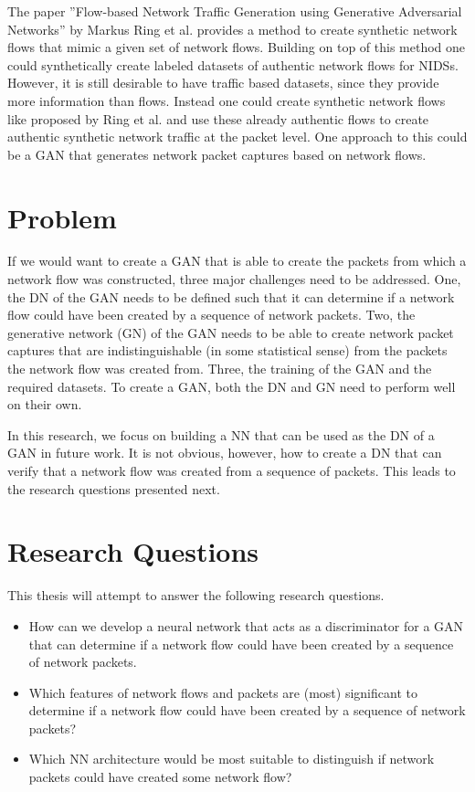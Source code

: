 \documentclass[
	ngerman,
	ruledheaders=section,%
	class=report,%
	thesis={type=bachelor},%
	accentcolor=9c,%
	custommargins=true,%
	marginpar=false,%
	parskip=half-,%
	fontsize=11pt,%
]{tudapub}
\begin{document}
The paper ''Flow-based Network Traffic Generation using Generative Adversarial Networks'' by Markus Ring et al. \cite{ringFlowbasedNetworkTraffic2019a} provides a method to create synthetic network flows that mimic a given set of network flows.
Building on top of this method one could synthetically create labeled datasets of authentic network flows for NIDSs.
However, it is still desirable to have traffic based datasets, since they provide more information than flows.
Instead one could create synthetic network flows like proposed by Ring et al. \cite{ringFlowbasedNetworkTraffic2019a} and
use these already authentic flows to create authentic synthetic network traffic at the packet level.
One approach to this could be a GAN that generates network packet captures based on network flows.

\section{Problem}
\label{sec:problem}

If we would want to create a GAN that is able to create the packets from which a network flow was constructed,
three major challenges need to be addressed.
One, the DN of the GAN needs to be defined such that it can determine if a network flow could have been created by a sequence of network packets.
Two, the generative network (GN) of the GAN needs to be able to create network packet captures that are indistinguishable (in some statistical sense) from the packets the network flow was created from.
Three, the training of the GAN and the required datasets.
To create a GAN, both the DN and GN need to perform well on their own.

In this research, we focus on building a NN that can be used as the DN of a GAN in future work.
It is not obvious, however, how to create a DN that
can verify that a network flow was created from a sequence of packets.
This leads to the research questions presented next.

\section{Research Questions}
\label{sec:researchQuestions}

This thesis will attempt to answer the following research questions.

\begin{itemize}
  \item How can we develop a neural network that acts as a discriminator for a GAN
  that can determine if a network flow could have been created by a sequence of network packets.
  \item Which features of network flows and packets are (most) significant to determine if a network flow could have been created by a sequence of network packets?
  \item Which NN architecture would be most suitable to distinguish if network packets could have created some network flow?
\end{itemize}
\end{document}
